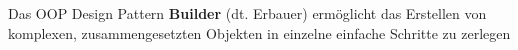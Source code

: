 Das OOP Design Pattern \textbf{Builder} (dt. Erbauer) ermöglicht das Erstellen von komplexen, zusammengesetzten Objekten in einzelne einfache Schritte zu zerlegen